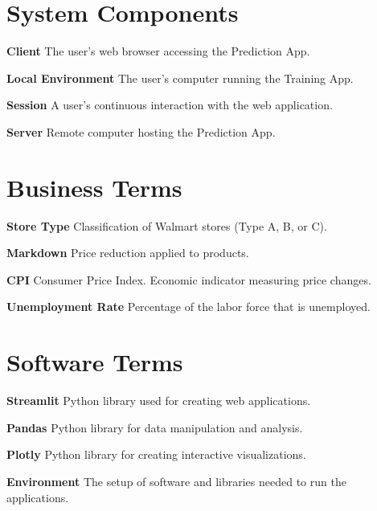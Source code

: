 \section{System Components}

\textbf{Client}
The user's web browser accessing the Prediction App.

\textbf{Local Environment}
The user's computer running the Training App.

\textbf{Session}
A user's continuous interaction with the web application.

\textbf{Server}
Remote computer hosting the Prediction App.

\section{Business Terms}

\textbf{Store Type}
Classification of Walmart stores (Type A, B, or C).

\textbf{Markdown}
Price reduction applied to products.

\textbf{CPI}
Consumer Price Index. Economic indicator measuring price changes.

\textbf{Unemployment Rate}
Percentage of the labor force that is unemployed.

\section{Software Terms}

\textbf{Streamlit}
Python library used for creating web applications.

\textbf{Pandas}
Python library for data manipulation and analysis.

\textbf{Plotly}
Python library for creating interactive visualizations.

\textbf{Environment}
The setup of software and libraries needed to run the applications.